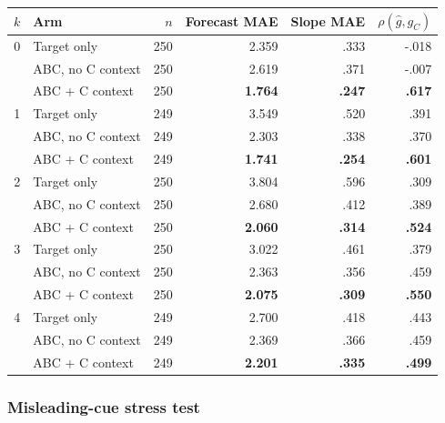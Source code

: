 \begin{center}
\begin{minipage}{\linewidth}
\centering
{}
\label{tab:coin-city-recovery-opus5}
\small
\begin{tabular}{c l r r r r}
\toprule
$k$ & Arm & $n$ & Forecast MAE & Slope MAE & $\rho(\hat g,g_C)$ \\
\midrule
0 & Target only & 250 & 2.359 & .333 & -.018 \\
  & ABC, no C context & 250 & 2.619 & .371 & -.007 \\
  & ABC + C context & 250 & \textbf{1.764} & \textbf{.247} & \textbf{.617} \\
\midrule
1 & Target only & 249 & 3.549 & .520 & .391 \\
  & ABC, no C context & 249 & 2.303 & .338 & .370 \\
  & ABC + C context & 249 & \textbf{1.741} & \textbf{.254} & \textbf{.601} \\
\midrule
2 & Target only & 250 & 3.804 & .596 & .309 \\
  & ABC, no C context & 250 & 2.680 & .412 & .389 \\
  & ABC + C context & 250 & \textbf{2.060} & \textbf{.314} & \textbf{.524} \\
\midrule
3 & Target only & 250 & 3.022 & .461 & .379 \\
  & ABC, no C context & 250 & 2.363 & .356 & .459 \\
  & ABC + C context & 250 & \textbf{2.075} & \textbf{.309} & \textbf{.550} \\
\midrule
4 & Target only & 249 & 2.700 & .418 & .443 \\
  & ABC, no C context & 249 & 2.369 & .366 & .459 \\
  & ABC + C context & 249 & \textbf{2.201} & \textbf{.335} & \textbf{.499} \\
\bottomrule
\end{tabular}
\end{minipage}
\end{center}




\subsubsection{Misleading-cue stress test}

